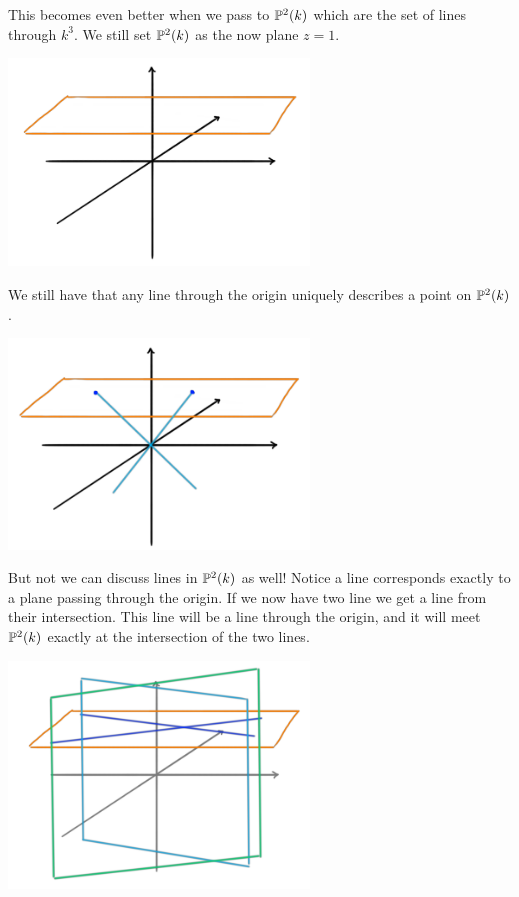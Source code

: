 \begin{solution}
This becomes even better when we pass to $\P^2(k)$ which are the set of lines through $k^3$. We still set $\P^2(k)$ as the now plane $z=1$. 

\begin{center}
\includegraphics[width=8cm]{img/lecture_5/projective4.5.png}
\end{center}

We still have that any line through the origin uniquely describes a point on $\P^2(k)$. 
\begin{center}
\includegraphics[width=8cm]{img/lecture_5/projective4.6.png}
\end{center}

But not we can discuss lines in $\P^2(k)$ as well! Notice a line corresponds exactly to a plane passing through the origin. If we now have two line we get a line from their intersection. This line will be a line through the origin, and it will meet $\P^2(k)$ exactly at the intersection of the two lines.
\begin{center}
\includegraphics[width=8cm]{img/lecture_5/projective5.png}
\end{center}


\end{solution}
